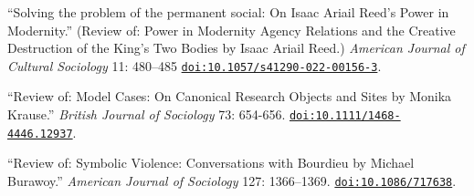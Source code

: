 
\ind ``Solving the problem of the permanent social: On Isaac Ariail Reed's Power in Modernity.'' (Review of: Power in Modernity Agency Relations and the Creative Destruction of the King’s Two Bodies by Isaac Ariail Reed.) {\em American Journal of Cultural Sociology}  11: 480–485 \href{https://doi.org/10.1057/s41290-022-00156-3}{\nolinkurl{doi:10.1057/s41290-022-00156-3}}.

\ind ``Review of: Model Cases: On Canonical Research Objects and Sites by Monika Krause.'' {\em British Journal of Sociology} 73: 654-656. \href{https://doi.org/10.1111/1468-4446.12937}{\nolinkurl{doi:10.1111/1468-4446.12937}}. 

\ind ``Review of: Symbolic Violence: Conversations with Bourdieu by Michael Burawoy.'' {\em American Journal of Sociology} 127: 1366–1369. \href{https://doi.org/10.1086/717638}{\nolinkurl{doi:10.1086/717638}}.
